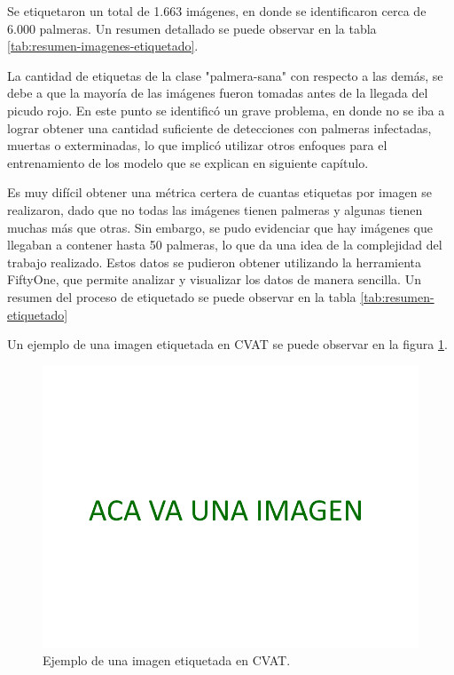 Se etiquetaron un total de 1.663 imágenes, en donde se identificaron cerca de 6.000 palmeras. Un resumen detallado se puede observar en la tabla \ref{tab:resumen-imagenes-etiquetado}.


La cantidad de etiquetas de la clase "palmera-sana" con respecto a las demás, se debe a que la mayoría de las imágenes fueron tomadas antes de la llegada del picudo rojo. En este punto se identificó un grave problema, en donde no se iba a lograr obtener una cantidad suficiente de detecciones con palmeras infectadas, muertas o exterminadas, lo que implicó utilizar otros enfoques para el entrenamiento de los modelo que se explican en siguiente capítulo.

Es muy difícil obtener una métrica certera de cuantas etiquetas por imagen se realizaron, dado que no todas las imágenes tienen palmeras y algunas tienen muchas más que otras. Sin embargo, se pudo evidenciar que hay imágenes que llegaban a contener hasta 50 palmeras, lo que da una idea de la complejidad del trabajo realizado. Estos datos se pudieron obtener utilizando la herramienta FiftyOne, que permite analizar y visualizar los datos de manera sencilla. Un resumen del proceso de etiquetado se puede observar en la tabla \ref{tab:resumen-etiquetado}


Un ejemplo de una imagen etiquetada en CVAT se puede observar en la figura \ref{fig:imagen-etiquetada-cvat}.

\begin{figure}[H]
  \centering
  \includegraphics[scale=0.2]{./Figures/place-holder.png}
  \caption{Ejemplo de una imagen etiquetada en CVAT.}
  \label{fig:imagen-etiquetada-cvat}
\end{figure}

